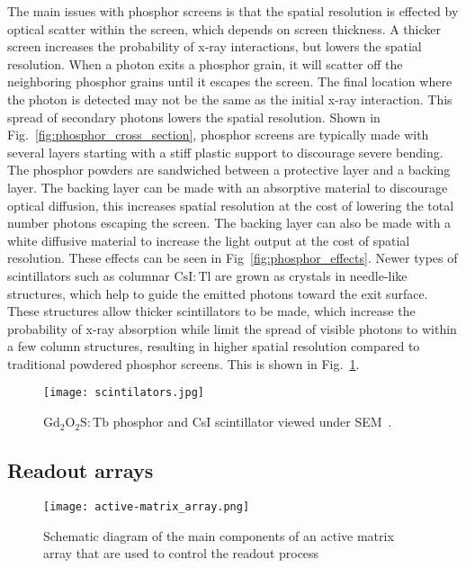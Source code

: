 The main issues with phosphor screens is that the spatial resolution is effected by optical scatter within the screen, which depends on screen thickness.  A thicker screen increases the probability of x-ray interactions, but lowers the spatial resolution.  When a photon exits a phosphor grain, it will scatter off the neighboring phosphor grains until it escapes the screen.  The final location where the photon is detected may not be the same as the initial x-ray interaction.  This spread of secondary photons lowers the spatial resolution.  Shown in Fig.~\ref{fig:phosphor_cross_section}, phosphor screens are typically made with several layers starting with a stiff plastic support to discourage severe bending.  The phosphor powders are sandwiched between a protective layer and a backing layer.  The backing layer can be made with an absorptive material to discourage optical diffusion, this increases spatial resolution at the cost of lowering the total number photons escaping the screen.  The backing layer can also be made with a white diffusive material to increase the light output at the cost of spatial resolution.  These effects can be seen in Fig~\ref{fig:phosphor_effects}.  Newer types of scintillators such as columnar $\mathrm{CsI:Tl}$ are grown as crystals in needle-like structures, which help to guide the emitted photons toward the exit surface.  These structures allow thicker scintillators to be made, which increase the probability of x-ray absorption while limit the spread of visible photons to within a few column structures, resulting in higher spatial resolution compared to traditional powdered phosphor screens.  This is shown in Fig.~\ref{fig:scintillators}.

\begin{figure}[ht]
\texttt{[image: scintilators.jpg]}
\caption{$\mathrm{Gd_2O_2S:Tb}$ phosphor and CsI scintillator viewed under SEM~\citep{scintillatorImage}.}
\label{fig:scintillators}
\end{figure}

\subsection{Readout arrays}

\begin{figure}[ht]
\texttt{[image: active-matrix\_array.png]}
\caption[]{Schematic diagram of the main components of an active matrix array that are used to control the readout process\footnotemark~\citep{Fahrig2008}}
\label{fig:schematic_active-matrix_array}
\end{figure}

